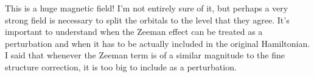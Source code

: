 \documentclass[10pt]{article} %
\begin{document}
This is a huge magnetic field! I'm not entirely sure of it, but perhaps a very strong field is
necessary to split the orbitals to the level that they agree. It's important to understand when
the Zeeman effect can be treated as a perturbation and when it has to be actually included in
the original Hamiltonian. I said that whenever the Zeeman term is of a similar magnitude to the
fine structure correction, it is too big to include as a perturbation.\\
\end{document}
